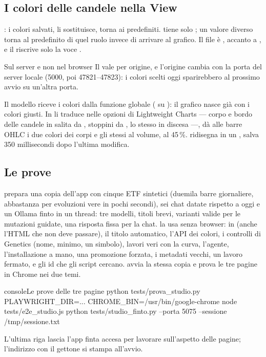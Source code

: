 \subsection{I colori delle candele nella View}

:  i colori salvati,  li sostituisce,  torna ai predefiniti.
 tiene solo ; un
valore diverso torna al predefinito di quel ruolo invece di arrivare al
grafico. Il file è , accanto a
, e il  riscrive solo la voce .

\begin{perche}{Sul server e non nel browser}
Il  vale per origine, e l'origine cambia con la porta del
server locale (5000, poi 47821--47823): i colori scelti oggi sparirebbero al
prossimo avvio su un'altra porta.
\end{perche}

\noindent
Il modello riceve i colori dalla funzione globale 
( su ): il grafico nasce già con i
colori giusti. In   li traduce nelle
opzioni di Lightweight Charts --- corpo e bordo delle candele in salita da
, stoppini da , lo stesso in discesa ---,
 dà alle barre OHLC i due colori dei corpi e
 gli stessi al volume, al 45\,\%.
 ridisegna in un ,
 salva \num{350} millisecondi dopo l'ultima modifica.

\subsection{Le prove}

 prepara una copia dell'app con cinque ETF
sintetici (duemila barre giornaliere, abbastanza per evoluzioni vere in pochi
secondi), sei chat datate rispetto a oggi e un Ollama finto in un thread: tre
modelli, titoli brevi, varianti valide per le mutazioni guidate, una risposta
fissa per la chat.  la usa senza browser:
 in  (anche l'HTML che non deve passare), il
titolo automatico, l'API dei colori, i controlli di Genetics (nome, minimo,
un simbolo), lavori veri con la curva, l'agente, l'installazione a mano, una
promozione forzata, i metadati vecchi, un lavoro fermato, e gli id che gli
script cercano.  avvia la stessa copia e prova le
tre pagine in Chrome nei due temi.

\begin{codiceInterno}{console}{Le prove delle tre pagine}{}
python tests/prova_studio.py
PLAYWRIGHT_DIR=... CHROME_BIN=/usr/bin/google-chrome node tests/e2e_studio.js
python tests/studio_finto.py --porta 5075 --sessione /tmp/sessione.txt
\end{codiceInterno}

\noindent
L'ultima riga lascia l'app finta accesa per lavorare sull'aspetto delle
pagine; l'indirizzo con il gettone si stampa all'avvio.
